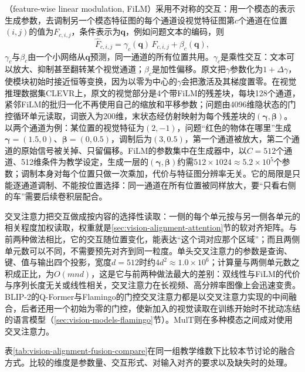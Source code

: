 （feature-wise linear modulation, FiLM）采用不对称的交互：用一个模态的表示生成参数，去调制另一个模态特征图的每个通道设视觉特征图第$c$个通道在位置$(i,j)$的值为$F_{c,i,j}$，条件表示为$\bm q$，例如问题文本的编码，则
\begin{equation}
  \widehat F_{c,i,j}=\gamma_c(\bm q)\,F_{c,i,j}+\beta_c(\bm q),
  \label{eq:vision-alignment-film}
\end{equation}
$\gamma_c$与$\beta_c$由一个小网络从$\bm q$预测，同一通道的所有位置共用。$\gamma_c$是乘性交互：文本可以放大、抑制甚至翻转某个视觉通道；$\beta_c$是加性偏移。原文把$\gamma$参数化为$1+\Delta\gamma$，使模块初始时接近恒等变换，因为以零为中心的$\gamma$会把激活及其梯度置零。在视觉推理数据集CLEVR上，原文的视觉部分是4个带FiLM的残差块，每块128个通道，紧邻FiLM的批归一化不再使用自己的缩放和平移参数；问题由4096维隐状态的门控循环单元读取，词嵌入为200维，末状态经仿射映射为每个残差块的$(\bm\gamma,\bm\beta)$。以两个通道为例：某位置的视觉特征为$(2,-1)$，问题“红色的物体在哪里”生成$\bm\gamma=(1.5,0)$、$\bm\beta=(0,0.5)$，调制后为$(3,0.5)$，第一个通道被放大，第二个通道的原始信号被关掉、只留偏移。FiLM的参数集中在生成器中，以$C=512$个通道、512维条件为教学设定，生成一层的$(\bm\gamma,\bm\beta)$约需$512\times1024\approx5.2\times10^5$个参数；调制本身对每个位置只做一次乘加，代价与特征图分辨率无关。它的局限是只能逐通道调制、不能按位置选择：同一通道在所有位置被同样放大，要“只看右侧的车”需要后续卷积层配合。

交叉注意力把交互做成按内容的选择性读取：一侧的每个单元按与另一侧各单元的相关程度加权读取，权重就是\ref{sec:vision-alignment-attention}节的软对齐矩阵。与前两种做法相比，它的交互随位置变化，能表达“这个词对应那个区域”；而且两侧单元数可以不同，不需要预先对齐到同一粒度。单头交叉注意力的参数是查询、键、值与输出四个投影，宽度$d=512$时约$4d^2\approx1.0\times10^6$；计算量与两侧单元数之积成正比，为$O(mnd)$，这是它与前两种做法最大的差别：双线性与FiLM的代价与序列长度无关或线性相关，交叉注意力在长视频、高分辨率图像上会迅速变贵。BLIP-2的Q-Former与Flamingo的门控交叉注意力都是以交叉注意力实现的中间融合，后者还用一个初始为零的门控，使新加入的视觉读取在训练开始时不扰动冻结的语言模型（\ref{sec:vision-models-flamingo}节）。MulT则在多种模态之间成对使用交叉注意力。

表\ref{tab:vision-alignment-fusion-compare}在同一组教学维数下比较本节讨论的融合方式。比较的维度是参数量、交互形式、对输入对齐的要求以及缺失时的处理。

